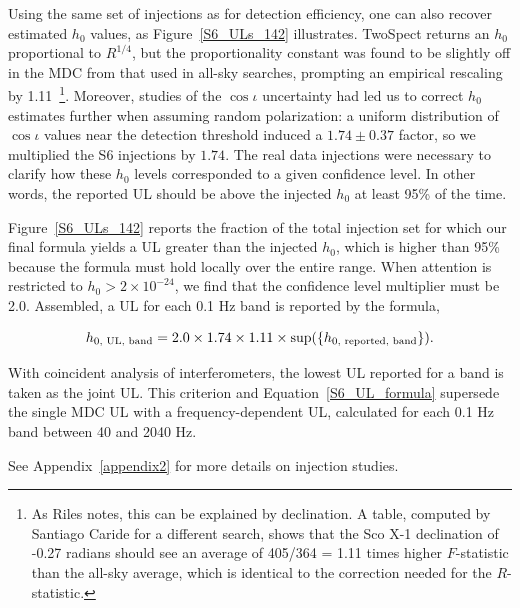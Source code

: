 Using the same set of injections as for detection efficiency, one can also recover estimated $h_0$ values, as Figure~\ref{S6_ULs_142} illustrates.
TwoSpect returns an $h_0$ proportional to $R^{1/4}$, but the proportionality constant was found to be slightly off in the MDC from that used in all-sky searches, prompting an empirical rescaling by 1.11~\footnote{As Riles notes, this can be explained by declination. A table, computed by Santiago Caride for a different search, shows that the Sco X-1 declination of -0.27 radians should see an average of 405/364 = 1.11 times higher $F$-statistic than the all-sky average, which is identical to the correction needed for the $R$-statistic.}.
Moreover, studies of the $\cos \iota$ uncertainty had led us to correct $h_0$ estimates further when assuming random polarization: a uniform distribution of $\cos \iota$ values near the detection threshold induced a $1.74 \pm 0.37$ factor, so we multiplied the S6 injections by $1.74$.
The real data injections were necessary to clarify how these $h_0$ levels corresponded to a given confidence level. 
In other words, the reported UL should be above the injected $h_0$ at least 95\% of the time.

Figure~\ref{S6_ULs_142} reports the fraction of the total injection set for which our final formula yields a UL greater than the injected $h_0$, which is higher than 95\% because the formula must hold locally over the entire range.
When attention is restricted to $h_0 > 2\times10^{-24}$, we find that the confidence level multiplier must be 2.0.
Assembled, a UL for each 0.1 Hz band is reported by the formula,

\begin{equation}
h_{0,\textup{ UL, band}} = 2.0 \times 1.74 \times 1.11 \times \textup{sup}(\{h_{0, \textup{ reported, band}}\}).
\label{S6_UL_formula}
\end{equation}

\noindent With coincident analysis of interferometers, the lowest UL reported for a band is taken as the joint UL.
This criterion and Equation~\ref{S6_UL_formula} supersede the single MDC UL with a frequency-dependent UL, calculated for each 0.1 Hz band between 40 and 2040 Hz.

See Appendix~\ref{appendix2} for more details on injection studies.


